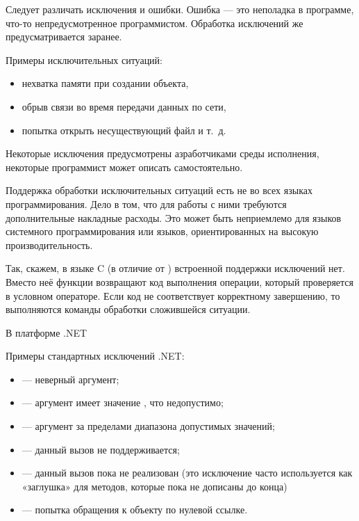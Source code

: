 Следует различать исключения и ошибки. Ошибка — это неполадка в
программе, что-то непредусмотренное программистом. Обработка
исключений же предусматривается заранее.

Примеры исключительных ситуаций:
\begin{itemize}
\item нехватка памяти при создании объекта,
\item обрыв связи во время передачи данных по сети,
\item попытка открыть несуществующий файл и т.~д.
\end{itemize}

Некоторые исключения предусмотрены азработчиками среды исполнения,
некоторые программист может описать самостоятельно.

Поддержка обработки исключительных ситуаций есть не во всех языках
программирования. Дело в том, что для работы с ними требуются
дополнительные накладные расходы. Это может быть неприемлемо для
языков системного программирования или языков, ориентированных на
высокую производительность.

Так, скажем, в языке C (в отличие от \CPP) встроенной поддержки
исключений нет. Вместо неё функции возвращают код выполнения операции,
который проверяется в условном операторе. Если код не соответствует
корректному завершению, то выполняются команды обработки сложившейся
ситуации.


В платформе .NET

Примеры стандартных исключений .NET:

\begin{itemize}
\item {} — неверный аргумент;
\item {} — аргумент имеет значение
  , что недопустимо;
\item {} — аргумент за пределами
  диапазона допустимых значений;
\item {} — данный вызов не поддерживается;
\item {} — данный вызов пока не
  реализован (это исключение часто используется как «заглушка» для
  методов, которые пока не дописаны до конца)
\item {} — попытка обращения к
  объекту по нулевой ссылке.
\end{itemize}

